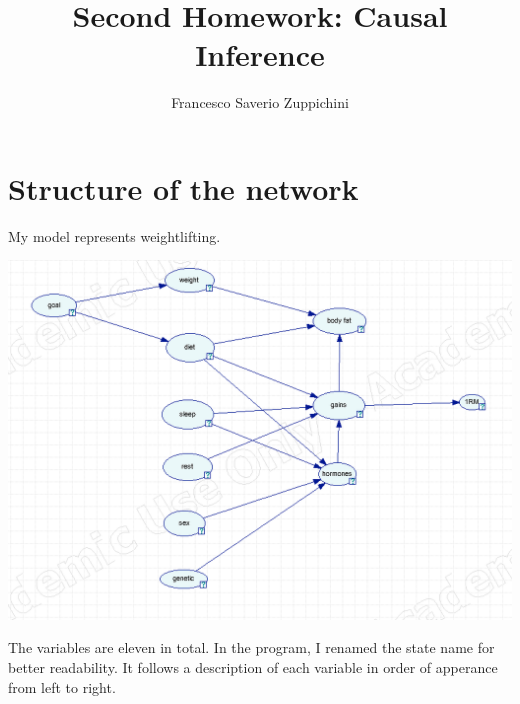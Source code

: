 \documentclass[11pt]{article}
\title{Second Homework: Causal Inference}
\author{Francesco Saverio Zuppichini}
\begin{document}
\maketitle
\section{Structure of the network}
My model represents weightlifting.  

\includegraphics[width=\textwidth]{./images/net.png}

The variables are eleven in total. In the program, I renamed the state
name for better readability. It follows a description of each variable
in order of apperance from left to right.
\end{document}
